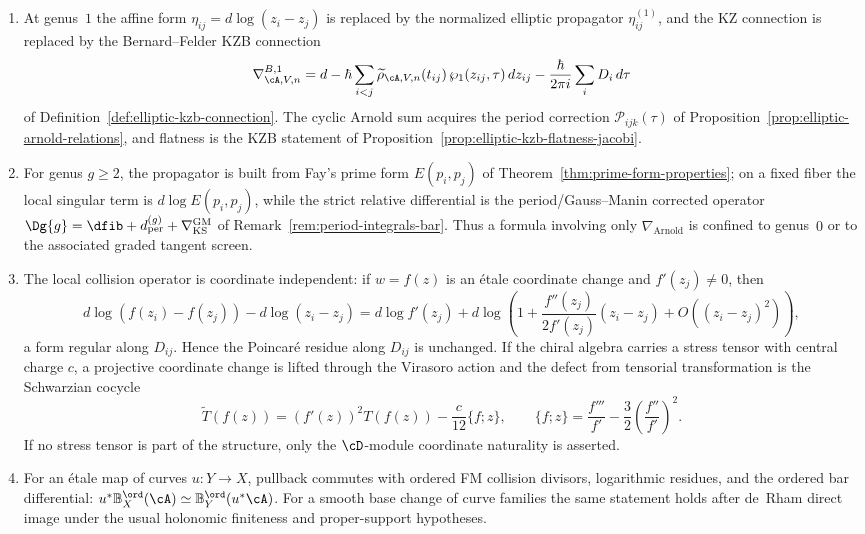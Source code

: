 \begin{theorem}
\begin{enumerate}[label=\textup{(\roman*)}]
to the Arnold three-term relation for the forms together with the
infinitesimal braid relations for the generators. After applying
$\rho_{\cA,V,n}$, the same statement holds modulo
$\ker\rho_{\cA,V,n}$.
\item At genus~$1$ the affine form \(\eta_{ij}=d\log(z_i-z_j)\) is
replaced by the normalized elliptic propagator
\(\eta^{(1)}_{ij}\), and the KZ connection is replaced by the
Bernard--Felder KZB connection
\[
\nabla^{B,1}_{\cA,V,n}
=d-\hbar\sum_{i<j}
\widetilde\rho_{\cA,V,n}(t_{ij})\,
\wp_1(z_{ij},\tau)\,dz_{ij}
-\frac{\hbar}{2\pi i}\sum_iD_i\,d\tau
\]
of Definition~\ref{def:elliptic-kzb-connection}. The cyclic Arnold sum
acquires the period correction
\(\mathcal P_{ijk}(\tau)\) of
Proposition~\ref{prop:elliptic-arnold-relations}, and flatness is the
KZB statement of Proposition~\ref{prop:elliptic-kzb-flatness-jacobi}.
\item For genus \(g\ge2\), the propagator is built from Fay's prime
form \(E(p_i,p_j)\) of
Theorem~\ref{thm:prime-form-properties}; on a fixed fiber the local
singular term is \(d\log E(p_i,p_j)\), while the strict relative
differential is the period/Gauss--Manin corrected operator
\(\Dg{g}=\dfib+d_{\mathrm{per}}^{(g)}
+\nabla_{\mathrm{KS}}^{\mathrm{GM}}\) of
Remark~\ref{rem:period-integrals-bar}. Thus a formula involving only
\(\nabla_{\mathrm{Arnold}}\) is confined to genus~\(0\) or to the
associated graded tangent screen.
\item The local collision operator is coordinate independent: if
$w=f(z)$ is an \'{e}tale coordinate change and \(f'(z_j)\ne0\), then
\begin{equation}\label{eq:kz-coordinate-regular-difference}
d\log(f(z_i)-f(z_j))-d\log(z_i-z_j)
=d\log f'(z_j)
+d\log\!\left(
1+\frac{f''(z_j)}{2f'(z_j)}(z_i-z_j)+O((z_i-z_j)^2)
\right),
\end{equation}
a form regular along \(D_{ij}\). Hence the Poincar\'e residue along
\(D_{ij}\) is unchanged. If the chiral algebra carries a stress tensor
with central charge \(c\), a projective coordinate change is lifted
through the Virasoro action and the defect from tensorial
transformation is the Schwarzian cocycle
\begin{equation}\label{eq:kz-virasoro-coordinate-cocycle}
\widetilde T(f(z))
=(f'(z))^2T(f(z))-\frac{c}{12}\{f;z\},
\qquad
\{f;z\}=\frac{f'''}{f'}-\frac32\left(\frac{f''}{f'}\right)^2 .
\end{equation}
If no stress tensor is part of the structure, only the $\cD$-module
coordinate naturality is asserted.
\item For an \'{e}tale map of curves $u\colon Y\to X$, pullback
commutes with ordered FM collision divisors, logarithmic residues, and
the ordered bar differential:
$u^*\mathbb B^{\ord}_X(\cA)\simeq
\mathbb B^{\ord}_Y(u^*\cA)$. For a smooth base change of curve
families the same statement holds after de~Rham direct image under the
usual holonomic finiteness and proper-support hypotheses.
\end{enumerate}
\end{theorem}

